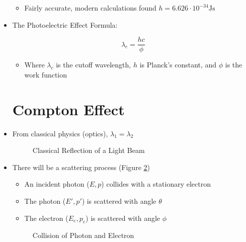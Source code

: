 \begin{itemize}
\begin{itemize}
      \item Fairly accurate, modern calculations found $h=6.626\cdot10^{-34} \si{\joule\second}$

    \end{itemize}

  \item The Photoelectric Effect Formula:

    $$\boxed{\lambda_c=\frac{hc}{\phi}}$$

    \begin{itemize}

      \item Where $\lambda_c$ is the cutoff wavelength, $h$ is Planck's constant, and $\phi$ is the work function

    \end{itemize}

    \section{Compton Effect}

  \item From classical physics (optics), $\lambda_1=\lambda_2$

    \begin{figure}[h!]
      \centering
      
      \caption{Classical Reflection of a Light Beam}
      \label{fig:2}
    \end{figure}

  \item There will be a scattering process (Figure \ref{fig:3})

    \begin{itemize}

      \item An incident photon ($E,p$) collides with a stationary electron

      \item The photon ($E',p'$) is scattered with angle $\theta$

      \item The electron ($E_e,p_e$) is scattered with angle $\phi$

    \end{itemize}

    \begin{figure}[h!]
      \centering
      
      \caption{Collision of Photon and Electron}
      \label{fig:3}
    \end{figure}


\end{itemize}
